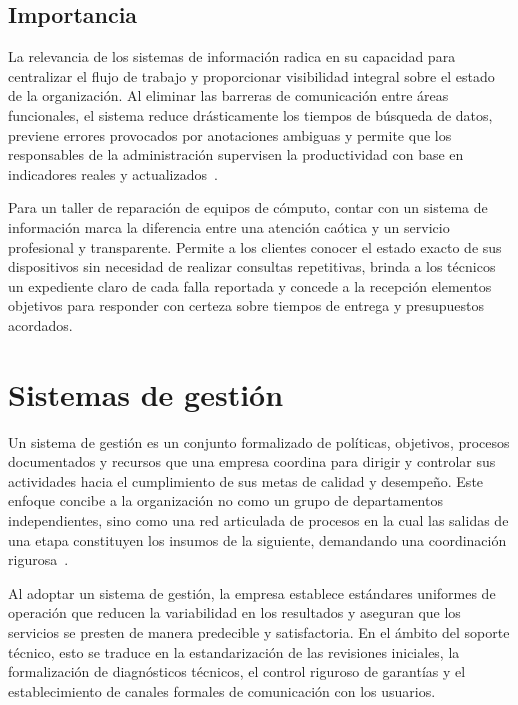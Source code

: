 \subsection{Importancia}

La relevancia de los sistemas de información radica en su capacidad para centralizar el flujo de trabajo y proporcionar visibilidad integral sobre el estado de la organización. Al eliminar las barreras de comunicación entre áreas funcionales, el sistema reduce drásticamente los tiempos de búsqueda de datos, previene errores provocados por anotaciones ambiguas y permite que los responsables de la administración supervisen la productividad con base en indicadores reales y actualizados~\cite{laudon2020management, stair2018principles}.

Para un taller de reparación de equipos de cómputo, contar con un sistema de información marca la diferencia entre una atención caótica y un servicio profesional y transparente. Permite a los clientes conocer el estado exacto de sus dispositivos sin necesidad de realizar consultas repetitivas, brinda a los técnicos un expediente claro de cada falla reportada y concede a la recepción elementos objetivos para responder con certeza sobre tiempos de entrega y presupuestos acordados.

\section{Sistemas de gestión}

Un sistema de gestión es un conjunto formalizado de políticas, objetivos, procesos documentados y recursos que una empresa coordina para dirigir y controlar sus actividades hacia el cumplimiento de sus metas de calidad y desempeño. Este enfoque concibe a la organización no como un grupo de departamentos independientes, sino como una red articulada de procesos en la cual las salidas de una etapa constituyen los insumos de la siguiente, demandando una coordinación rigurosa~\cite{iso9001_2015}.

Al adoptar un sistema de gestión, la empresa establece estándares uniformes de operación que reducen la variabilidad en los resultados y aseguran que los servicios se presten de manera predecible y satisfactoria. En el ámbito del soporte técnico, esto se traduce en la estandarización de las revisiones iniciales, la formalización de diagnósticos técnicos, el control riguroso de garantías y el establecimiento de canales formales de comunicación con los usuarios.


